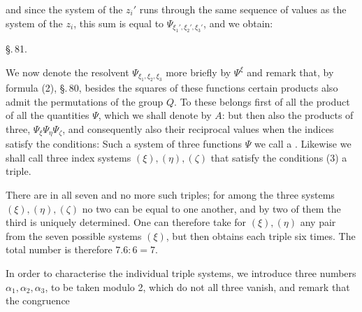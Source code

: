 
and since the system of the $z_i'$ runs through the same sequence of values as the system of the $z_i$, this sum is equal to $\Psi_{\xi_1',\xi_2',\xi_3'}$, and we obtain:


\begin{center}
\S.\,81.\\
\end{center}

We now denote the resolvent $\Psi_{\xi_1,\xi_2,\xi_3}$ more briefly by $\Psi^\xi$ and remark that, by formula (2), \S.\,80, besides the squares of these functions certain products also admit the permutations of the group $Q$. To these belongs first of all the product of all the quantities $\Psi$, which we shall denote by $A$:
but then also the products of three, $\Psi_\xi \Psi_\eta \Psi_\zeta$, and consequently also their reciprocal values
when the indices satisfy the conditions:
Such a system of three functions $\Psi$ we call a . Likewise we shall call three index systems $(\xi), (\eta), (\zeta)$ that satisfy the conditions (3) a triple.

There are in all seven and no more such triples; for among the three systems $(\xi), (\eta), (\zeta)$ no two can be equal to one another, and by two of them the third is uniquely determined. One can therefore take for $(\xi), (\eta)$ any pair from the seven possible systems $(\xi)$, but then obtains each triple six times. The total number is therefore $7 . 6 : 6 = 7$.

In order to characterise the individual triple systems, we introduce three numbers $\alpha_1, \alpha_2, \alpha_3$, to be taken modulo 2, which do not all three vanish, and remark that the congruence

